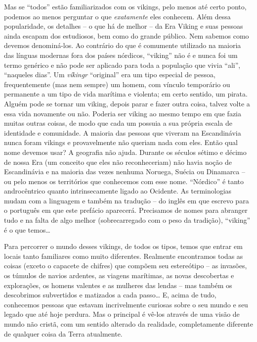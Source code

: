 Mas se ``todos'' estão familiarizados com os vikings, pelo menos até
certo ponto, podemos ao menos perguntar o que
\emph{exatamente} eles conhecem. Além dessa popularidade, os detalhes --
o que há de melhor -- da Era Viking e suas pessoas ainda escapam dos
estudiosos, bem como do grande público. Nem sabemos como devemos
denominá-los. Ao contrário do que é comumente utilizado na maioria das
línguas modernas fora dos países nórdicos, ``viking'' não é e nunca foi
um termo genérico e não pode ser aplicado para toda a população que
vivia ``ali'', ``naqueles dias''. Um \emph{víkingr} ``original'' era um
tipo especial de pessoa, frequentemente (mas nem sempre) um homem, com
vínculo temporário ou permanente a um tipo de vida marítima e violenta;
em certo sentido, um pirata. Alguém pode se tornar um viking, depois
parar e fazer outra coisa, talvez volte a essa vida novamente ou não.
Poderia ser viking ao mesmo tempo em que fazia muitas outras coisas, de modo que cada um possuia a sua própria escala de identidade e comunidade. A maioria das
pessoas que viveram na Escandinávia nunca foram vikings e provavelmente
não queriam nada com eles. Então qual nome devemos usar? A geografia não
ajuda. Durante os séculos sétimo e décimo de nossa Era (um conceito que
eles não reconheceriam) não havia noção de Escandinávia e na maioria das
vezes nenhuma Noruega, Suécia ou Dinamarca -- ou pelo menos os
territórios que conhecemos com esse nome. ``Nórdico'' é tanto
androcêntrico quanto intrinsecamente ligado ao Ocidente. As
terminologias mudam com a linguagem e também na tradução -- do inglês em
que escrevo para o português em que este prefácio aparecerá. Precisamos
de nomes para abranger tudo e na falta de algo melhor (sobrecarregado
com o peso da tradição), ``viking'' é o que temos\ldots{}

Para percorrer o mundo desses vikings, de todos os tipos, temos que
entrar em locais tanto familiares como muito diferentes. Realmente
encontramos todas as coisas (exceto o capacete de chifres) que compõem
seu estereótipo -- as invasões, os túmulos de navios ardentes, as
viagens marítimas, as novas descobertas e explorações, os homens
valentes e as mulheres das lendas -- mas também os descobrimos
subvertidos e matizados a cada passo\ldots{} E, acima de tudo, conhecemos
pessoas que estavam incrivelmente curiosas sobre o seu mundo e seu legado
que até hoje perdura. Mas o principal é vê-los através de uma visão de mundo
não cristã, com um sentido alterado da realidade, completamente
diferente de qualquer coisa da Terra atualmente.

